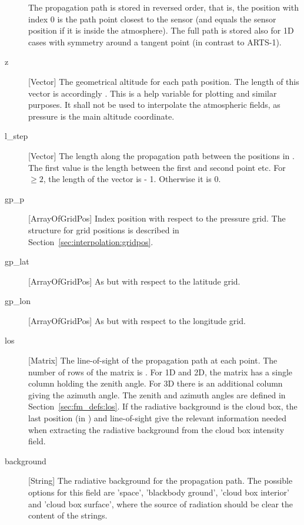 \begin{description}
     The propagation path is stored in reversed order, that is, the
     position with index 0 is the path point closest to the sensor
     (and equals the sensor position if it is inside the atmosphere).
     The full path is stored also for 1D cases with symmetry around a
     tangent point (in contrast to ARTS-1). 
     
  \item[z] [Vector] The geometrical altitude for each path position. The
     length of this vector is accordingly . This is a help
     variable for plotting and similar purposes. It shall not be used to
     interpolate the atmospheric fields, as pressure is the main altitude
     coordinate.
     
   \item[l\_step] [Vector] The length along the propagation path
     between the positions in . The first value is the
     length between the first and second point etc. For 
     $\geq 2$, the length of the vector is  - 1.
     Otherwise it is 0.

   \item[gp\_p] [ArrayOfGridPos] Index position with respect to the
     pressure grid. The structure for grid positions is described in
     Section~\ref{sec:interpolation:gridpos}. 
     
   \item[gp\_lat] [ArrayOfGridPos] As  but with
     respect to the latitude grid.

   \item[gp\_lon] [ArrayOfGridPos] As  but with
     respect to the longitude grid.
     
   \item[los] [Matrix] The line-of-sight of the propagation path at
     each point. The number of rows of the matrix is .
     For 1D and 2D, the matrix has a single column holding the zenith
     angle. For 3D there is an additional column giving the azimuth
     angle. The zenith and azimuth angles are defined in
     Section~\ref{sec:fm_defs:los}. If the radiative background is the
     cloud box, the last position (in ) and
     line-of-sight give the relevant information needed when
     extracting the radiative background from the cloud box intensity
     field.
     
   \item[background] [String] The radiative background for the
     propagation path. The possible
     options for this field are 'space', 'blackbody ground', 'cloud
     box interior' and 'cloud box surface', where the source of
     radiation should be clear the content of the strings.
     

\end{description}
